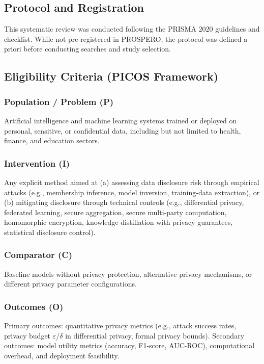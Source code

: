 \documentclass[11pt,a4paper]{article}
\begin{document}
\subsection{Protocol and Registration}

This systematic review was conducted following the PRISMA 2020 guidelines and checklist. While not pre-registered in PROSPERO, the protocol was defined a priori before conducting searches and study selection.

\subsection{Eligibility Criteria (PICOS Framework)}

\subsubsection{Population / Problem (P)}
Artificial intelligence and machine learning systems trained or deployed on personal, sensitive, or confidential data, including but not limited to health, finance, and education sectors.

\subsubsection{Intervention (I)}
Any explicit method aimed at (a) assessing data disclosure risk through empirical attacks (e.g., membership inference, model inversion, training-data extraction), or (b) mitigating disclosure through technical controls (e.g., differential privacy, federated learning, secure aggregation, secure multi-party computation, homomorphic encryption, knowledge distillation with privacy guarantees, statistical disclosure control).

\subsubsection{Comparator (C)}
Baseline models without privacy protection, alternative privacy mechanisms, or different privacy parameter configurations.

\subsubsection{Outcomes (O)}
Primary outcomes: quantitative privacy metrics (e.g., attack success rates, privacy budget $\varepsilon$/$\delta$ in differential privacy, formal privacy bounds). Secondary outcomes: model utility metrics (accuracy, F1-score, AUC-ROC), computational overhead, and deployment feasibility.
\end{document}

